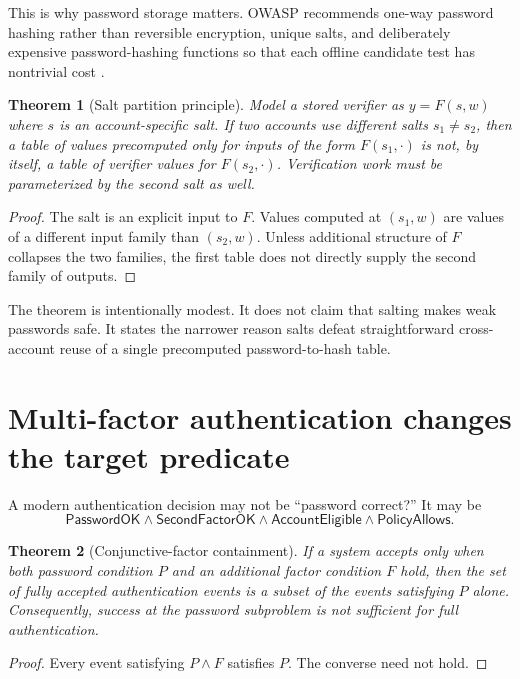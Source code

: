 \documentclass[11pt,openany]{book}
\newtheorem{theorem}{Theorem}[chapter]
\theoremstyle{definition}
\theoremstyle{remark}
\begin{document}
This is why password storage matters. OWASP recommends one-way password hashing rather than reversible encryption, unique salts, and deliberately expensive password-hashing functions so that each offline candidate test has nontrivial cost \cite{OWASPPasswordStorage}.

\begin{theorem}[Salt partition principle]\label{thm:salt}
Model a stored verifier as $y=F(s,w)$ where $s$ is an account-specific salt. If two accounts use different salts $s_1\neq s_2$, then a table of values precomputed only for inputs of the form $F(s_1,\cdot)$ is not, by itself, a table of verifier values for $F(s_2,\cdot)$. Verification work must be parameterized by the second salt as well.
\end{theorem}
\begin{proof}
The salt is an explicit input to $F$. Values computed at $(s_1,w)$ are values of a different input family than $(s_2,w)$. Unless additional structure of $F$ collapses the two families, the first table does not directly supply the second family of outputs.
\end{proof}

The theorem is intentionally modest. It does not claim that salting makes weak passwords safe. It states the narrower reason salts defeat straightforward cross-account reuse of a single precomputed password-to-hash table.

\section{Multi-factor authentication changes the target predicate}
A modern authentication decision may not be ``password correct?'' It may be
\[
\textsf{PasswordOK}\wedge\textsf{SecondFactorOK}\wedge\textsf{AccountEligible}\wedge\textsf{PolicyAllows}.
\]

\begin{theorem}[Conjunctive-factor containment]\label{thm:mfa}
If a system accepts only when both password condition $P$ and an additional factor condition $F$ hold, then the set of fully accepted authentication events is a subset of the events satisfying $P$ alone. Consequently, success at the password subproblem is not sufficient for full authentication.
\end{theorem}
\begin{proof}
Every event satisfying $P\wedge F$ satisfies $P$. The converse need not hold.
\end{proof}
\end{document}
